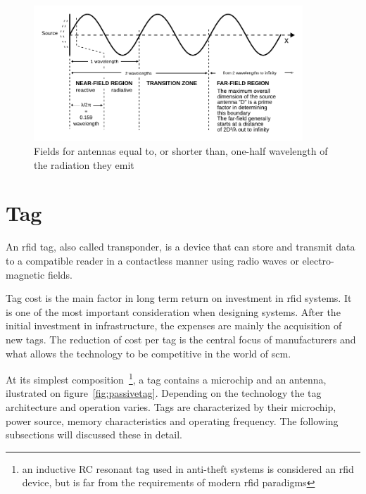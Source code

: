 \begin{figure}[!ht]
    \centering
    \includegraphics[width=0.9\textwidth]{./figs/02-state-of-the-art/Field_regions_for_typical_antennas_vector.pdf}
    \caption[Fields for antennas equal to, or shorter than, one-half wavelength of the radiation they emit]{Fields for antennas equal to, or shorter than, one-half wavelength of the radiation they emit~\cite{SafetyHealthTopics}} 
    \label{fig:fieldregionsshortantenna}
\end{figure}

\section{Tag} \label{sec:tag}

An \ac{rfid} tag, also called transponder, is a device that can store and transmit data to a compatible reader in a contactless manner using radio waves or electro-magnetic fields.

Tag cost is the main factor in long term return on investment in \ac{rfid} systems. It is one of the most important consideration when designing systems. After the initial investment in infrastructure, the expenses are mainly the acquisition of new tags.
The reduction of cost per tag is the central focus of manufacturers and what allows the technology to be competitive in the world of \ac{scm}.

At its simplest composition~\footnote{an inductive RC resonant tag used in anti-theft systems is considered an \ac{rfid} device, but is far from the requirements of modern \ac{rfid} paradigms}, a tag contains a microchip and an antenna, ilustrated on figure~\ref{fig:passivetag}.
Depending on the technology the tag architecture and operation varies.
Tags are characterized by their microchip, power source, memory characteristics and operating frequency. The following subsections will discussed these in detail.

